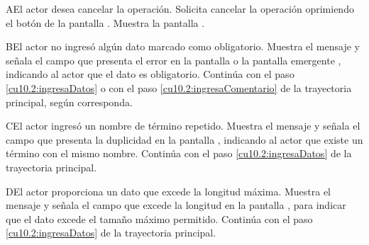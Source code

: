  \begin{UCtrayectoriaA}{A}{El actor desea cancelar la operación.}
    \UCpaso[\UCactor] Solicita cancelar la operación oprimiendo el botón  de la pantalla .
    \UCpaso[\UCsist] Muestra la pantalla .
 \end{UCtrayectoriaA} 
 \begin{UCtrayectoriaA}{B}{El actor no ingresó algún dato marcado como obligatorio.}
    \UCpaso[\UCsist] Muestra el mensaje  y señala el campo que presenta el error en la pantalla 
	     o la pantalla emergente , indicando al actor que el dato es obligatorio.
    \UCpaso[] Continúa con el paso \ref{cu10.2:ingresaDatos} o con el paso \ref{cu10.2:ingresaComentario} de la trayectoria principal, según corresponda.
 \end{UCtrayectoriaA}
 \begin{UCtrayectoriaA}{C}{El actor ingresó un nombre de término repetido.}
    \UCpaso[\UCsist] Muestra el mensaje  y señala el campo que presenta la duplicidad en la pantalla 
	    , indicando al actor que existe un término con el mismo nombre.
    \UCpaso[] Continúa con el paso \ref{cu10.2:ingresaDatos} de la trayectoria principal.
 \end{UCtrayectoriaA}
 
 \begin{UCtrayectoriaA}{D}{El actor proporciona un dato que excede la longitud máxima.}
    \UCpaso[\UCsist] Muestra el mensaje  y señala el campo que excede la 
    longitud en la pantalla , para indicar que el dato excede el tamaño máximo permitido.
    \UCpaso[] Continúa con el paso \ref{cu10.2:ingresaDatos} de la trayectoria principal.
 \end{UCtrayectoriaA}
 
